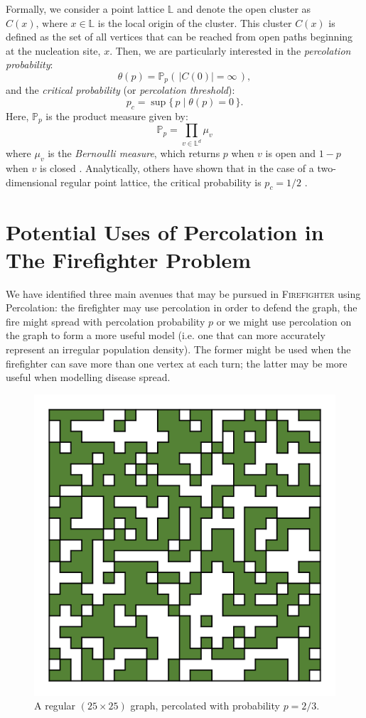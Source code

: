 \documentclass[11pt]{amsart}
\begin{document}
Formally, we consider a point lattice $\mathbb{L}$ and denote the open cluster as $C(x)\text{,~where~}x\in\mathbb{L}$ is the local origin of the cluster. This cluster $C(x)$ is defined as the set of all vertices that can be reached from open paths beginning at the nucleation site, $x$. Then, we are particularly interested in the \emph{percolation probability}:
$$
\theta(p) = \mathbb{P}_p(\,|C(0)|=\infty\,),
$$
and the \emph{critical probability} (or \emph{percolation threshold}):
$$
p_c = \sup\{\,p \mid \theta(p)=0\,\}.
$$
Here, $\mathbb{P}_p$ is the product measure given by:
$$
\displaystyle \mathbb{P}_p=\prod_{v\in\mathbb{L}^d}\mu_v
$$
where $\mu_v$ is the \emph{Bernoulli measure}, which returns $p$ when $v$ is open and $1-p$ when $v$ is closed \cite[p. 28]{klenke14}. Analytically, others have shown that in the case of a two-dimensional regular point lattice, the critical probability is $p_c=1/2$ \cite{kersten80}.


\section{Potential Uses of Percolation in The Firefighter Problem}

We have identified three main avenues that may be pursued in {\scshape Firefighter} using Percolation: the firefighter may use percolation in order to defend the graph, the fire might spread with percolation probability $p$ or we might use percolation on the graph to form a more useful model (i.e. one that can more accurately represent an irregular population density). The former might be used when the firefighter can save more than one vertex at each turn; the latter may be more useful when modelling disease spread.
\begin{figure}[ht]
	\centering
		\includegraphics[width=0.3\linewidth]{firebreak/25x25/25x25}
	\caption{A regular $(25\times25)$ graph, percolated with probability $p=2/3$.}
	\label{fig:largeperc}
\end{figure}

\end{document}
